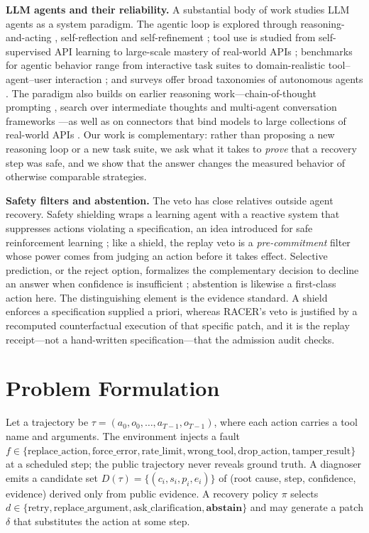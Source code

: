 \documentclass[10pt]{article}
\begin{document}
\textbf{LLM agents and their reliability.} A substantial body of work studies LLM agents as a system paradigm. The agentic loop is explored through reasoning-and-acting \cite{ref10}, self-reflection \cite{ref11} and self-refinement \cite{ref12}; tool use is studied from self-supervised API learning \cite{ref13} to large-scale mastery of real-world APIs \cite{ref14}; benchmarks for agentic behavior range from interactive task suites \cite{ref15,ref16,ref17,ref18} to domain-realistic tool--agent--user interaction \cite{ref6}; and surveys offer broad taxonomies of autonomous agents \cite{ref19,ref20,ref21}. The paradigm also builds on earlier reasoning work---chain-of-thought prompting \cite{ref22}, search over intermediate thoughts \cite{ref23} and multi-agent conversation frameworks \cite{ref24}---as well as on connectors that bind models to large collections of real-world APIs \cite{ref25}. Our work is complementary: rather than proposing a new reasoning loop or a new task suite, we ask what it takes to \emph{prove} that a recovery step was safe, and we show that the answer changes the measured behavior of otherwise comparable strategies.

\textbf{Safety filters and abstention.} The veto has close relatives outside agent recovery. Safety shielding wraps a learning agent with a reactive system that suppresses actions violating a specification, an idea introduced for safe reinforcement learning \cite{ref26}; like a shield, the replay veto is a \emph{pre-commitment} filter whose power comes from judging an action before it takes effect. Selective prediction, or the reject option, formalizes the complementary decision to decline an answer when confidence is insufficient \cite{ref27}; abstention is likewise a first-class action here. The distinguishing element is the evidence standard. A shield enforces a specification supplied a priori, whereas RACER's veto is justified by a recomputed counterfactual execution of that specific patch, and it is the replay receipt---not a hand-written specification---that the admission audit checks.

\section{Problem Formulation}

Let a trajectory be $\tau = (a_0, o_0, \ldots, a_{T-1}, o_{T-1})$, where each action carries a tool name and arguments. The environment injects a fault $f \in \{\text{replace\_action}, \text{force\_error}, \text{rate\_limit}, \text{wrong\_tool}, \text{drop\_action}, \text{tamper\_result}\}$ at a scheduled step; the public trajectory never reveals ground truth. A diagnoser emits a candidate set $D(\tau) = \{(c_i, s_i, p_i, e_i)\}$ of (root cause, step, confidence, evidence) derived only from public evidence. A recovery policy $\pi$ selects $d \in \{\text{retry}, \text{replace\_argument}, \text{ask\_clarification}, \textbf{abstain}\}$ and may generate a patch $\delta$ that substitutes the action at some step.
\end{document}
